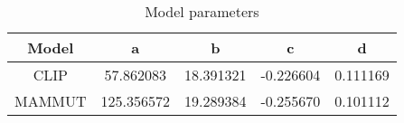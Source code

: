 \begin{table}
\centering
\begin{tabular}{|c||c|c|c|c|}
\hline
\textbf{Model} & \textbf{a} & \textbf{b} & \textbf{c} & \textbf{d} \\
\hline
CLIP & 57.862083 & 18.391321 & -0.226604 & 0.111169 \\
\hline
MAMMUT & 125.356572 & 19.289384 & -0.255670 & 0.101112 \\
\hline
\end{tabular}
\caption{Model parameters}
\label{tab:coefficients}
\end{table}
